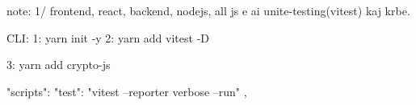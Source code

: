 note: 
1/ frontend, react, backend, nodejs, all js e ai unite-testing(vitest) kaj krbe.

CLI:
1: yarn init -y
2: yarn add vitest -D

3: yarn add crypto-js

"scripts": {
    "test": "vitest --reporter verbose --run"
  },